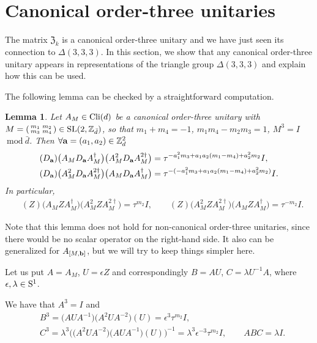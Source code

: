 \documentclass[pdftex]{sigma}
\numberwithin{equation}{section}
\newtheorem{Lemma}[Theorem]{Lemma}
\newcommand{\mmod}{\mathrm{~mod~}}
\newcommand{\mbb}{\mathbb}
\begin{document}
\section{Canonical order-three unitaries}\label{sec:can}

The matrix $\mathfrak{Z}_k$ is a canonical order-three unitary and
we have just seen its connection to $\Delta{(3,3,3)}$.
In this section, we show that any canonical order-three unitary appears
in representations of the triangle group $\Delta{(3,3,3)}$ and explain
how this can be used.

The following lemma can be checked by a straightforward computation.

\begin{Lemma}\label{can:lem}
 Let $A_M \in {\rm Cli}(d)$ be a canonical order-three unitary with
 $M = \left(\begin{smallmatrix} m_1 & m_2 \\ m_3 & m_4\end{smallmatrix}\right) \in {\rm SL}(2, \mbb{Z}_{\bar{d}})$, so that
 $m_1+m_4 = -1$, $m_1m_4-m_2m_3 = 1$, $M^3 = I$ $\mmod \bar{d}$.
 Then $\forall {\bf a} = (a_1,a_2)\in \mbb{Z}_d^2$
 \begin{align*}
 & (D_{\bf a})\bigl(A_MD_{\bf a}A_M^\dag\bigr)\bigl(A_M^2D_{\bf a}A_M^{2\dag}\bigr)
 = \tau^{-a_1^2m_3+a_1a_2(m_1-m_4)+a_2^2m_2}I, \\
 & (D_{\bf a})\bigl(A_M^2D_{\bf a}A_M^{2\dag}\bigr)\bigl(A_MD_{\bf a}A_M^\dag\bigr)
 = \tau^{-(-a_1^2m_3+a_1a_2(m_1-m_4)+a_2^2m_2)}I.
 \end{align*}
 In particular,
 \begin{align*}
 & (Z)\bigl(A_MZA_M^\dag\bigr)\bigl(A_M^2ZA_M^{2\dag}\bigr) = \tau^{m_2}I, \qquad (Z)\bigl(A_M^2ZA_M^{2\dag}\bigr)\bigl(A_MZA_M^\dag\bigr) = \tau^{-m_2}I.
 \end{align*}
\end{Lemma}

Note that this lemma does not hold for non-canonical order-three unitaries, since
there would be no scalar operator on the right-hand side.
It also can be generalized for $A_{[M, \bf b]}$,
but we will try to keep things simpler here.

Let us put $A = A_M$, $U = \epsilon Z$ and
correspondingly $B = AU$, $C=\lambda U^{-1}A$, where $\epsilon, \lambda \in {\rm S}^1$.

We have that $A^3 = I$ and
\begin{align*}
 &B^3 = \bigl(AUA^{-1}\bigr)\bigl(A^2UA^{-2}\bigr)(U) = \epsilon^3 \tau^{m_2} I , \\
& C^3 = \lambda^3 \bigl(\bigl(A^2UA^{-2}\bigr)\bigl(AUA^{-1}\bigr)(U))^{-1} = \lambda^3 \epsilon^{-3} \tau^{m_2} I, \qquad
 ABC = \lambda I.
\end{align*}
\end{document}
